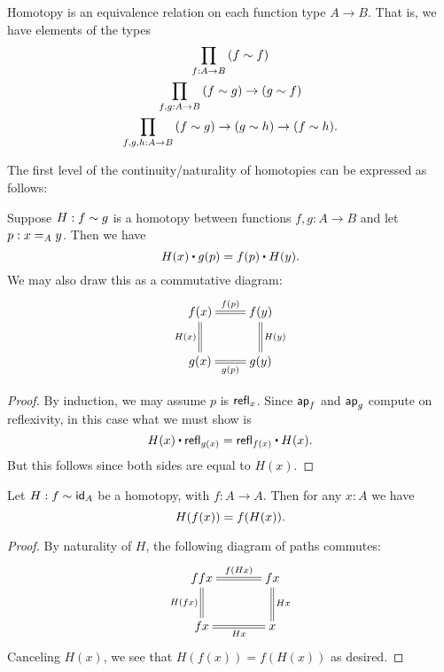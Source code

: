 \begin{lem}\label{lem:homotopy-props}
  Homotopy is an equivalence relation on each function type $A\to B$.
  That is, we have elements of the types
  \begin{gather*}
    \prd{f:A\to B} (f\htpy f)\\
    \prd{f,g:A\to B} (f\htpy g) \to (g\htpy f)\\
    \prd{f,g,h:A\to B} (f\htpy g) \to (g\htpy h) \to (f\htpy h).
  \end{gather*}
\end{lem}


The first level of the continuity/naturality of homotopies can be expressed as follows:

\begin{lem}\label{lem:htpy-natural}
  Suppose $H:f\htpy g$ is a homotopy between functions $f,g:A\to B$ and let $p:\id[A]xy$.  Then we have
  \begin{equation*}
    H(x)\ct\ap{g}{p}=\ap{f}{p}\ct H(y).
  \end{equation*}
  We may also draw this as a commutative diagram:
  \begin{align*}
    \xymatrix{
      f(x) \ar@{=}[r]^{\ap fp} \ar@{=}[d]_{H(x)} & f(y) \ar@{=}[d]^{H(y)} \\
      g(x) \ar@{=}[r]_{\ap gp} & g(y)
    }
  \end{align*}
\end{lem}
\begin{proof}
  By induction, we may assume $p$ is $\refl x$.
  Since $\apfunc{f}$ and $\apfunc g$ compute on reflexivity, in this case what we must show is
  \[ H(x) \ct \refl{g(x)} = \refl{f(x)} \ct H(x). \]
  But this follows since both sides are equal to $H(x)$.
\end{proof}

\begin{cor}\label{cor:hom-fg}
  Let $H : f \htpy \idfunc[A]$ be a homotopy, with $f : A \to A$. Then for any $x : A$ we have \[ H(f(x)) = \ap f{H(x)}. \]
\end{cor}
\begin{proof}
By naturality of $H$, the following diagram of paths commutes:
\begin{align*}
\xymatrix@C=3pc{
ffx \ar@{=}[r]^-{\ap f{Hx}} \ar@{=}[d]_{H(fx)} & fx \ar@{=}[d]^{Hx} \\
fx \ar@{=}[r]_-{Hx} & x
}
\end{align*}
Canceling $H(x)$, we see that $H(f(x)) = f(H(x))$ as desired.
\end{proof}

